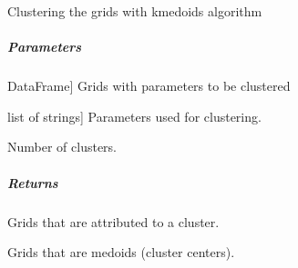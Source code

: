 \documentclass[letterpaper,10pt,english]{sphinxmanual}
\begin{document}
\begin{fulllineitems}
\label{\detokenize{classification/classification_steps/clustering:classification.clustering.clustering_algorithms.kmedoids_clustering}}
\pysigstartsignatures
{}
\pysigstopsignatures
\sphinxAtStartPar
Clustering the grids with kmedoids algorithm


\subparagraph{Parameters}
\label{\detokenize{classification/classification_steps/clustering:parameters}}\begin{description}
\sphinxlineitem{df\_parameters\_of\_grids}{[}DataFrame{]}
\sphinxAtStartPar
Grids with parameters to be clustered

\sphinxlineitem{list\_of\_clustering\_parameters}{[}list of strings{]}
\sphinxAtStartPar
Parameters used for clustering.

\sphinxAtStartPar
Number of clusters.

\end{description}


\subparagraph{Returns}
\label{\detokenize{classification/classification_steps/clustering:returns}}\begin{description}
\sphinxAtStartPar
Grids that are attributed to a cluster.

\sphinxAtStartPar
Grids that are medoids (cluster centers).

\end{description}

\end{fulllineitems}

\end{document}
